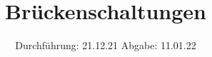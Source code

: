 

\subject{V302}
\title{Brückenschaltungen}
\date{
  Durchführung: 21.12.21
  \hspace{3em}
  Abgabe: 11.01.22
}



\maketitle
\thispagestyle{empty}
\tableofcontents
\newpage







\printbibliography{}


